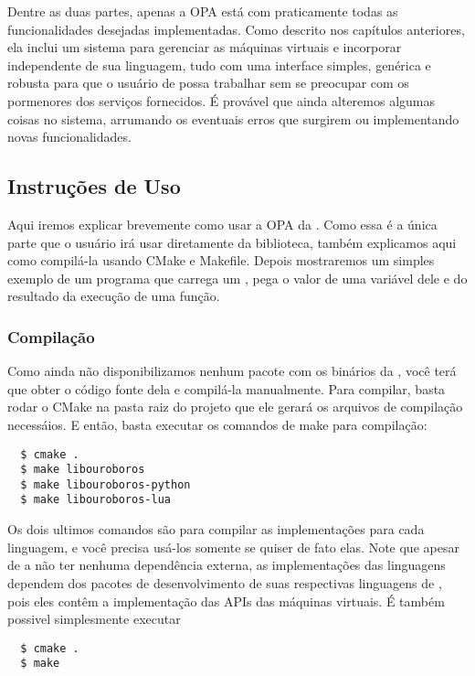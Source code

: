 Dentre as duas partes, apenas a OPA está com praticamente todas as
funcionalidades desejadas implementadas. Como descrito nos capítulos
anteriores, ela inclui um sistema para gerenciar as máquinas virtuais
e incorporar  independente de sua linguagem, tudo com uma
interface simples, genérica e robusta para que o usuário de \CXX{} possa
trabalhar sem se preocupar com os pormenores dos serviços fornecidos. É
provável que ainda alteremos algumas coisas no sistema, arrumando os
eventuais erros que surgirem ou implementando novas funcionalidades.

\subsection{Instruções de Uso}
Aqui iremos explicar brevemente como usar a OPA da . Como
essa é a única parte que o usuário irá usar diretamente da biblioteca, também
explicamos aqui como compilá-la usando CMake e Makefile. Depois mostraremos
um simples exemplo de um programa que carrega um \script{}, pega o valor de uma
variável dele e do resultado da execução de uma função.

\subsubsection{Compilação} 
Como ainda não disponibilizamos nenhum pacote
com os binários da , você terá que obter o código fonte dela
e compilá-la manualmente. Para compilar, basta rodar o CMake na pasta 
raiz do projeto que ele gerará os arquivos de compilação necessáios.
E então, basta executar os comandos de make para compilação:

\begin{verbatim}
  $ cmake .
  $ make libouroboros
  $ make libouroboros-python
  $ make libouroboros-lua
\end{verbatim}

Os dois ultimos comandos são para compilar as implementações para cada linguagem,
e você precisa usá-los somente se quiser de fato elas. Note que apesar de a
 não ter nenhuma dependência externa, as implementações
das linguagens dependem dos pacotes de desenvolvimento de suas respectivas
linguagens de \script{}, pois eles contêm a implementação das APIs das máquinas virtuais.
É também possivel simplesmente executar

\begin{verbatim}
  $ cmake .
  $ make
\end{verbatim}

